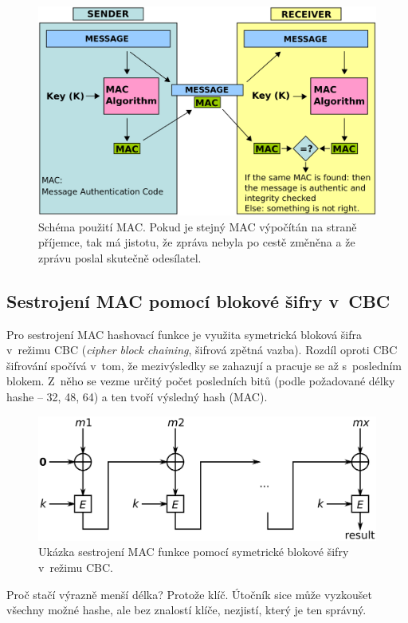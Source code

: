 \begin{figure}[H]
    \centering
    \includegraphics[width=1\linewidth]{mac.png}
    \caption{Schéma použití MAC. Pokud je stejný MAC výpočítán na straně příjemce, tak má jistotu, že zpráva nebyla po cestě změněna a že zprávu poslal skutečně odesílatel.}
\end{figure}

\subsection{Sestrojení MAC pomocí blokové šifry v~CBC}

Pro sestrojení MAC hashovací funkce je využita symetrická bloková šifra v~režimu CBC (\textit{cipher block chaining}, šifrová zpětná vazba). Rozdíl oproti CBC šifrování spočívá v~tom, že mezivýsledky se zahazují a pracuje se až s~posledním blokem. Z~něho se vezme určitý počet posledních bitů (podle požadované délky hashe -- 32, 48, 64) a ten tvoří výsledný hash (MAC).

\begin{figure}[H]
    \centering
    \includegraphics[width=0.8\linewidth]{mac_cbc.png}
    \caption{Ukázka sestrojení MAC funkce pomocí symetrické blokové šifry v~režimu CBC.}
\end{figure}

Proč stačí výrazně menší délka? Protože klíč. Útočník sice může vyzkoušet všechny možné hashe, ale bez znalostí klíče, nezjistí, který je ten správný.

